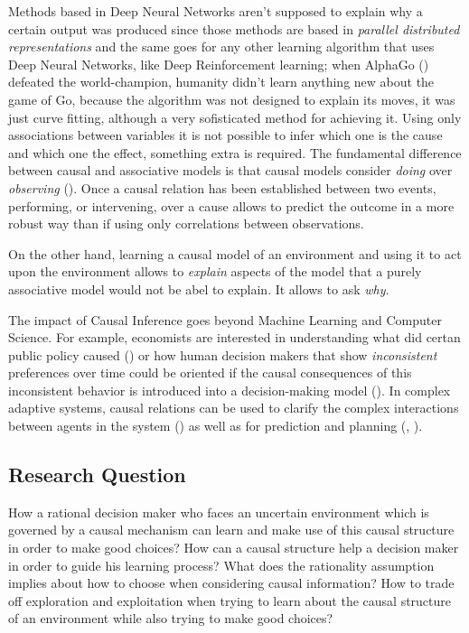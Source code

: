 \documentclass[english,letterpaper,12pt,final]{article}
\theoremstyle{definition}
\begin{document}
	Methods based in Deep Neural Networks aren't supposed to explain why a certain output was produced since those methods are based in \textit{parallel distributed representations} and the same goes for any other learning algorithm that uses Deep Neural Networks, like Deep Reinforcement learning; when AlphaGo (\cite{silver2017mastering}) defeated the world-champion, humanity didn't learn anything new about the game of Go, because the algorithm was not designed to explain its moves, it was just curve fitting, although a very sofisticated method for achieving it. Using only associations between variables it is not possible to infer which one is the cause and which one the effect, something extra is required. The fundamental difference between causal and associative models is that causal models consider \textit{doing} over \textit{observing} (\cite{pearl2018why}). Once a causal relation has been established between two events, performing, or intervening, over a cause allows to predict the outcome in a more robust way than if using only correlations between observations. 
	
	On the other hand, learning a causal model of an environment and using it to act upon the environment allows to \textit{explain} aspects of the model that a purely associative model would not be abel to explain. It allows to ask \textit{why}.
	
	The impact of Causal Inference goes beyond Machine Learning and Computer Science. For example, economists are interested in understanding what did certan public policy caused (\cite{athey2017impact}) or how human decision makers that show \textit{inconsistent} preferences over time could be oriented if the causal consequences of this inconsistent behavior is introduced into a decision-making model (\cite{albers2016motivating}). In complex adaptive systems, causal relations can be used to clarify the complex interactions between agents in the system (\cite{abbott2017complex}) as well as for prediction and planning (\cite{hunt2016ants}, \cite{brock2018causality}).
	
	\subsection{Research Question}
	How a rational decision maker who faces an uncertain environment which is governed by a causal mechanism can learn and make use of this causal structure in order to make good choices? How can a causal structure help a decision maker in order to guide his learning process? What does the rationality assumption implies about how to choose when considering causal information? How to trade off exploration and exploitation when trying to learn about the causal structure of an environment while also trying to make good choices?
\end{document}
